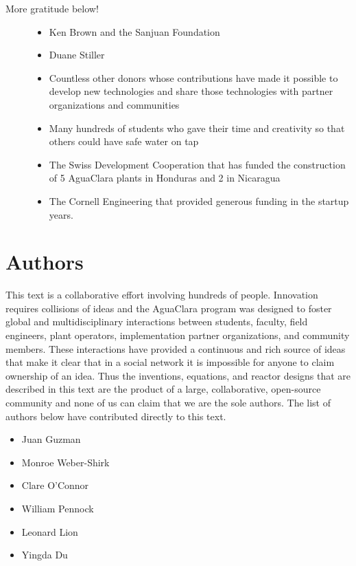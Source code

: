 \documentclass[letterpaper,10pt,english]{sphinxmanual}
\begin{document}
\begin{description}
\item[{More gratitude below!}] \leavevmode\begin{itemize}
\item {} 
Ken Brown and the Sanjuan Foundation

\item {} 
Duane Stiller

\item {} 
Countless other donors whose contributions have made it possible to develop new technologies and share those technologies with partner organizations and communities

\item {} 
Many hundreds of students who gave their time and creativity so that others could have safe water on tap

\item {} 
The Swiss Development Cooperation that has funded the construction of 5 AguaClara plants in Honduras and 2 in Nicaragua

\item {} 
The Cornell Engineering that provided generous funding in the startup years.

\end{itemize}

\end{description}


\chapter{Authors}
\label{\detokenize{Authors:authors}}\label{\detokenize{Authors:title-authors}}\label{\detokenize{Authors::doc}}
This text is a collaborative effort involving hundreds of people. Innovation requires collisions of ideas and the AguaClara program was designed to foster global and multidisciplinary interactions between students, faculty, field engineers, plant operators, implementation partner organizations, and community members. These interactions have provided a continuous and rich source of ideas that make it clear that in a social network it is impossible for anyone to claim ownership of an idea. Thus the inventions, equations, and reactor designs that are described in this text are the product of a large, collaborative, open-source community and none of us can claim that we are the sole authors. The list of authors below have contributed directly to this text.
\begin{itemize}
\item {} 
Juan Guzman

\item {} 
Monroe Weber-Shirk

\item {} 
Clare O’Connor

\item {} 
William Pennock

\item {} 
Leonard Lion

\item {} 
Yingda Du

\end{itemize}
\end{document}
